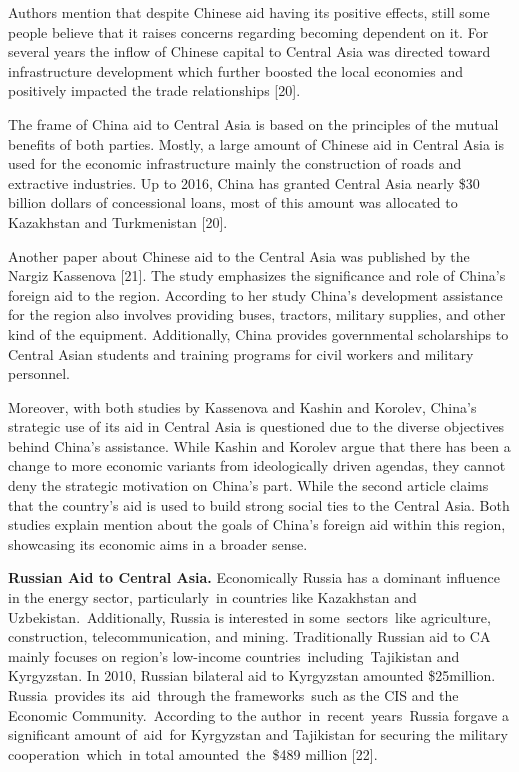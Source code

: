 \begin{multicols}{2}
Authors mention that despite Chinese aid having its positive effects,
still some people believe that it raises concerns regarding becoming
dependent on it. For several years the inflow of Chinese capital to
Central Asia was directed toward infrastructure development which
further boosted the local economies and positively impacted the trade
relationships {[}20{]}.

The frame of China aid to Central Asia is based on the principles of the
mutual benefits of both parties. Mostly, a large amount of Chinese aid
in Central Asia is used for the economic infrastructure mainly the
construction of roads and extractive industries. Up to 2016, China has
granted Central Asia nearly \$30 billion dollars of concessional loans,
most of this amount was allocated to Kazakhstan and Turkmenistan
{[}20{]}.

Another paper about Chinese aid to the Central Asia was published by the
Nargiz Kassenova {[}21{]}. The study emphasizes the significance and
role of China's foreign aid to the region. According to her study
China's development assistance for the region also involves providing
buses, tractors, military supplies, and other kind of the equipment.
Additionally, China provides governmental scholarships to Central Asian
students and training programs for civil workers and military personnel.

Moreover, with both studies by Kassenova and Kashin and Korolev, China's
strategic use of its aid in Central Asia is questioned due to the
diverse objectives behind China's assistance. While Kashin and Korolev
argue that there has been a change to more economic variants from
ideologically driven agendas, they cannot deny the strategic motivation
on China's part. While the second article claims that the country's aid
is used to build strong social ties to the Central Asia. Both studies
explain mention about the goals of China's foreign aid within this
region, showcasing its economic aims in a broader sense.

{\bfseries Russian Aid to Central Asia.} Economically Russia has a dominant
influence in the energy sector, particularly~in countries like
Kazakhstan and Uzbekistan.~Additionally, Russia is interested in
some~sectors~like agriculture, construction, telecommunication, and
mining. Traditionally Russian aid to CA mainly focuses on region's
low-income countries~including~Tajikistan and Kyrgyzstan. In 2010,
Russian bilateral aid to Kyrgyzstan amounted \$25million.
Russia~provides its~aid~through the frameworks~such as the CIS and the
Economic Community.~According to the author~in~recent~years~Russia
forgave a significant amount of~aid~for Kyrgyzstan and Tajikistan for
securing the military cooperation~which~in total amounted~the~\$489
million {[}22{]}.


\end{multicols}
